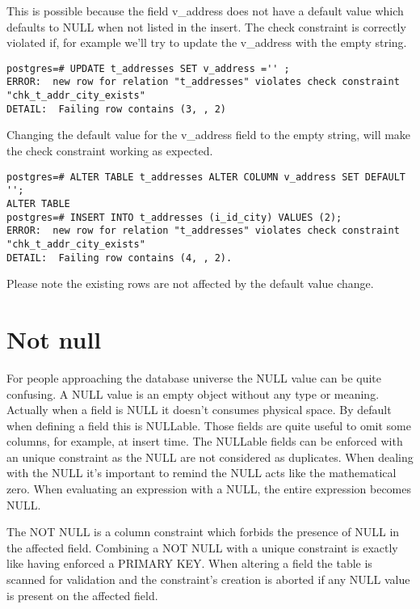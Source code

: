 This is possible because the field v\_address does not have a default value which defaults to NULL when
not listed in the insert. The check constraint is correctly violated if, for example we'll try to update
the v\_address with the empty string.

\begin{lstlisting}[style=pgsql]
postgres=# UPDATE t_addresses SET v_address ='' ;
ERROR:  new row for relation "t_addresses" violates check constraint "chk_t_addr_city_exists"
DETAIL:  Failing row contains (3, , 2)
\end{lstlisting}

Changing the default value for the v\_address field to the empty string, will make the check constraint
working as expected.

\begin{lstlisting}[style=pgsql]
postgres=# ALTER TABLE t_addresses ALTER COLUMN v_address SET DEFAULT '';
ALTER TABLE
postgres=# INSERT INTO t_addresses (i_id_city) VALUES (2);
ERROR:  new row for relation "t_addresses" violates check constraint "chk_t_addr_city_exists"
DETAIL:  Failing row contains (4, , 2).

\end{lstlisting}
Please note the existing rows are not affected by the default value change.


\section{Not null}
For people approaching the database universe the NULL value can be quite confusing. A NULL value is 
an empty object without any type or meaning. Actually when a field is NULL it doesn't consumes 
physical space. By default when defining a field this is NULLable. Those fields are quite useful to 
omit some columns, for example, at insert time.\newline
The NULLable fields can be enforced with an unique constraint as the NULL are not considered as 
duplicates. When dealing with the NULL it's important to remind the NULL acts like the mathematical 
zero. When evaluating an expression with a NULL, the entire expression becomes NULL.\newline

The NOT NULL is a column constraint which forbids the presence of NULL in the affected field. 
Combining a NOT NULL with a unique constraint is exactly like having enforced a PRIMARY KEY. When 
altering a field the table is scanned for validation and the constraint's creation is aborted if 
any NULL value is present on the affected field.\newline

